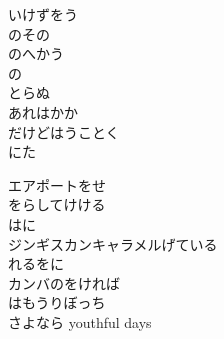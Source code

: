 \documentclass[10pt,b5j]{tarticle} %
\begin{document}
\begin{enumerate}
\begin{minipage}[c]{\blocksize}
        \vspace{\linespace}
        \item
        いけずをう\\
        のその\\
        のへかう\\
        の\\
        とらぬ\\
        あれはかか\\
        だけどはうことく\\
        にた
        
        \vspace{\linespace}
        \item
        エアポートをせ\\
        をらしてけける\\
        はに\\
        ジンギスカンキャラメルげている\\
        れるをに\\
        カンバのをければ\\
        はもうりぼっち\\
        さよなら youthful days
    
    \end{minipage}
\end{enumerate} %
\end{document}
